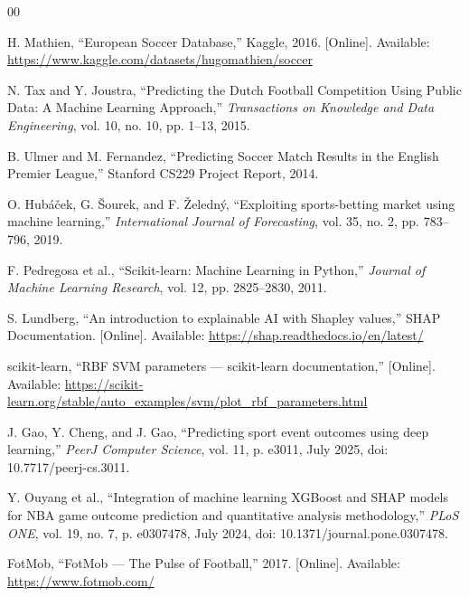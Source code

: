 \documentclass[conference]{IEEEtran}
\begin{document}
\begin{thebibliography}{00}

H. Mathien, ``European Soccer Database,'' Kaggle, 2016. [Online]. Available: \url{https://www.kaggle.com/datasets/hugomathien/soccer}

N. Tax and Y. Joustra, ``Predicting the Dutch Football Competition Using Public Data: A Machine Learning Approach,'' \textit{Transactions on Knowledge and Data Engineering}, vol. 10, no. 10, pp. 1--13, 2015.

B. Ulmer and M. Fernandez, ``Predicting Soccer Match Results in the English Premier League,'' Stanford CS229 Project Report, 2014.

O. Hub\'{a}\v{c}ek, G. \v{S}ourek, and F. \v{Z}eledn\'{y}, ``Exploiting sports-betting market using machine learning,'' \textit{International Journal of Forecasting}, vol. 35, no. 2, pp. 783--796, 2019.

F. Pedregosa et al., ``Scikit-learn: Machine Learning in Python,'' \textit{Journal of Machine Learning Research}, vol. 12, pp. 2825--2830, 2011.

S. Lundberg, ``An introduction to explainable AI with Shapley values,'' SHAP Documentation. [Online]. Available: \url{https://shap.readthedocs.io/en/latest/}

scikit-learn, ``RBF SVM parameters --- scikit-learn documentation,'' [Online]. Available: \url{https://scikit-learn.org/stable/auto_examples/svm/plot_rbf_parameters.html}

J. Gao, Y. Cheng, and J. Gao, ``Predicting sport event outcomes using deep learning,'' \textit{PeerJ Computer Science}, vol. 11, p. e3011, July 2025, doi: 10.7717/peerj-cs.3011.

Y. Ouyang et al., ``Integration of machine learning XGBoost and SHAP models for NBA game outcome prediction and quantitative analysis methodology,'' \textit{PLoS ONE}, vol. 19, no. 7, p. e0307478, July 2024, doi: 10.1371/journal.pone.0307478.

FotMob, ``FotMob --- The Pulse of Football,'' 2017. [Online]. Available: \url{https://www.fotmob.com/}

\end{thebibliography}
\end{document}

